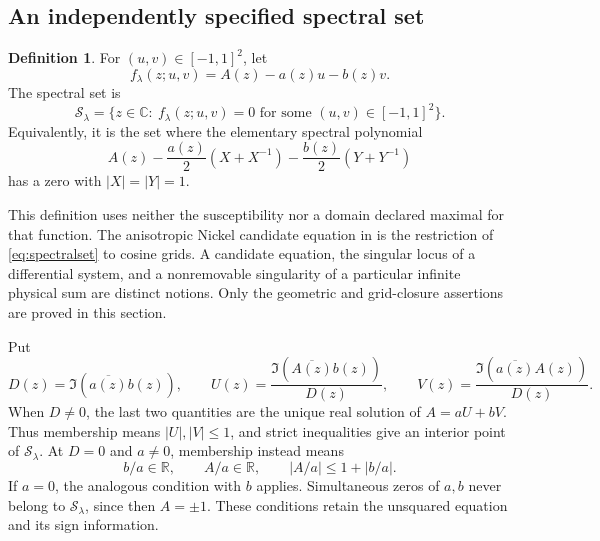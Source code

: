 \documentclass[11pt]{article}
\numberwithin{equation}{section}
\theoremstyle{definition}
\newtheorem{definition}[theorem]{Definition}
\newcommand{\C}{\mathbb C}
\newcommand{\R}{\mathbb R}
\newcommand{\cS}{\mathcal S}
\begin{document}
\subsection{An independently specified spectral set}

\begin{definition}\label{def:spectralset}
For \((u,v)\in[-1,1]^2\), let
\[
 f_\lambda(z;u,v)=A(z)-a(z)u-b(z)v.
\]
The spectral set is
\begin{equation}\label{eq:spectralset}
 \cS_\lambda
 =\{z\in\C:\ f_\lambda(z;u,v)=0
                    \text{ for some }(u,v)\in[-1,1]^2\}.
\end{equation}
Equivalently, it is the set where the elementary spectral polynomial
\[
 A(z)-\frac{a(z)}2(X+X^{-1})
       -\frac{b(z)}2(Y+Y^{-1})
\]
has a zero with \(|X|=|Y|=1\).
\end{definition}

This definition uses neither the susceptibility nor a domain declared
maximal for that function. The anisotropic Nickel candidate equation
in \cite[eq.~(54)]{BHM} is the restriction of
\eqref{eq:spectralset} to cosine grids. A candidate equation, the singular
locus of a differential system, and a nonremovable singularity of a
particular infinite physical sum are distinct notions. Only the
geometric and grid-closure assertions are proved in this section.

Put
\begin{equation}\label{eq:cramerUV}
 D(z)=\Im(\overline{a(z)}b(z)),\qquad
 U(z)=\frac{\Im(\overline{A(z)}b(z))}{D(z)},\qquad
 V(z)=\frac{\Im(\overline{a(z)}A(z))}{D(z)}.
\end{equation}
When \(D\ne0\), the last two quantities are the unique real solution
of \(A=aU+bV\). Thus membership means \(|U|,|V|\le1\), and strict
inequalities give an interior point of \(\cS_\lambda\). At \(D=0\)
and \(a\ne0\), membership instead means
\[
 b/a\in\R,\qquad A/a\in\R,\qquad |A/a|\le1+|b/a|.
\]
If \(a=0\), the analogous condition with \(b\) applies. Simultaneous
zeros of \(a,b\) never belong to \(\cS_\lambda\), since then
\(A=\pm1\). These conditions retain the unsquared equation and its
sign information.
\end{document}
